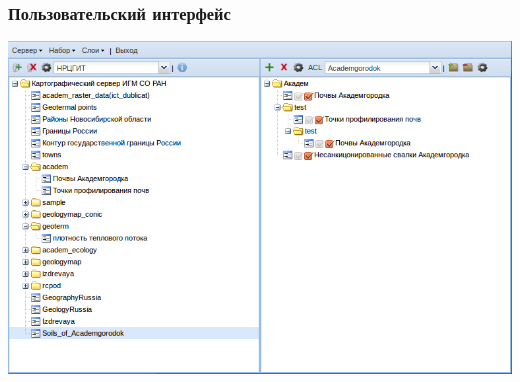 \begin{frame}
  \frametitle{Пользовательский интерфейс}
  \includegraphics[width=1.0\textwidth]{django-ss.png}
\end{frame}
